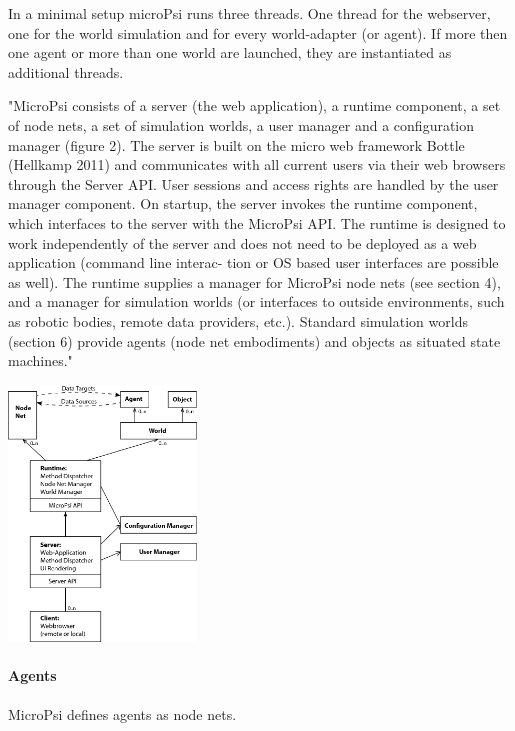 In a minimal setup microPsi runs three threads. One thread for the webserver, one for the world simulation and for every world-adapter (or agent). If more then one agent or more than one world are launched, they are instantiated as additional threads.

"MicroPsi consists of a server (the web application), a runtime component, a set of node nets, a set of simulation worlds, a user manager and a configuration manager (figure 2). The server is built on the micro web framework Bottle (Hellkamp 2011) and communicates with all current users via their web browsers through the Server API. User sessions and access rights are handled by the user manager component.
On startup, the server invokes the runtime component, which interfaces to the server with the MicroPsi API. The runtime is designed to work independently of the server and does not need to be deployed as a web application (command line interac- tion or OS based user interfaces are possible as well).
The runtime supplies a manager for MicroPsi node nets (see section 4), and a manager for simulation worlds (or interfaces to outside environments, such as robotic bodies, remote data providers, etc.). Standard simulation worlds (section 6) provide agents (node net embodiments) and objects as situated state machines."~\cite{conf/agi/Bach12}

            \includegraphics[width=5cm]{graphics/micropsi2_uml}
            
                \paragraph{Agents}
MicroPsi defines agents as node nets.~\cite{conf/agi/Bach12}
                
